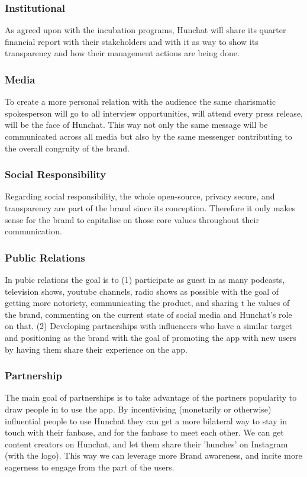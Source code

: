 \documentclass[12pt]{article}
\begin{document}
	\subsubsection{Institutional}
	As agreed upon with the incubation programs, Hunchat will share its quarter financial report with their stakeholders and with it as way to show its transparency and how their management actions are being done.
	
	\subsubsection{Media}
	To create a more personal relation with the audience the same charismatic spokesperson will go to all interview opportunities, will attend every press release, will be the face of Hunchat. This way not only the same message will be communicated across all media but also by the same messenger contributing to the overall congruity of the brand.
	
	\subsubsection{Social Responsibility}
	Regarding social responsibility, the whole open-source, privacy secure, and transparency are part of the brand since its conception. Therefore it only makes sense for the brand to capitalise on those core values throughout their communication. 
	
		\subsubsection{Public Relations}
	In pubic relations the goal is to (1) participate as guest in as many podcasts, television shows, youtube channels, radio shows as possible with the goal of getting more notoriety, communicating the product, and sharing t he values of the brand, commenting on the current state of social media and Hunchat's role on that. (2) Developing partnerships with influencers who have a similar target and positioning as the brand with the goal of promoting the app with new users by having them share their experience on the app.
	
	\subsubsection{Partnership}
	The main goal of partnerships is to take advantage of the partners popularity to draw people in to use the app. By incentivising (monetarily or otherwise) influential people to use Hunchat they can get a more bilateral way to stay in touch with their fanbase, and for the fanbase to meet each other.  We can get content creators on Hunchat, and let them share their 'hunches' on Instagram (with the logo). This way we can leverage more Brand awareness, and incite more eagerness to engage from the part of the users.
	
\end{document}
